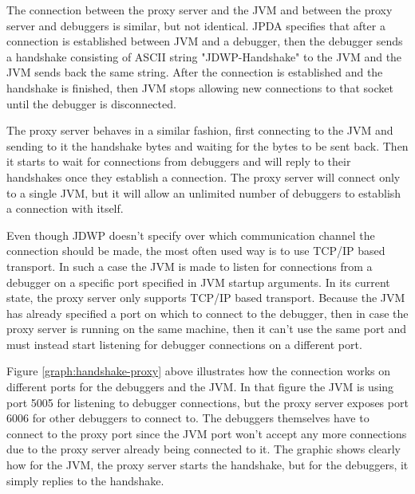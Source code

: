\documentclass[..thesis.tex]{subfiles}
\begin{document}
The connection between the proxy server and the JVM and between the proxy server and debuggers is similar, but not identical.
JPDA specifies that after a connection is established between JVM and a debugger, then the debugger sends a handshake consisting of ASCII string "JDWP-Handshake" to the JVM and the JVM sends back the same string.
After the connection is established and the handshake is finished, then JVM stops allowing new connections to that socket until the debugger is disconnected.

The proxy server behaves in a similar fashion, first connecting to the JVM and sending to it the handshake bytes and waiting for the bytes to be sent back.
Then it starts to wait for connections from debuggers and will reply to their handshakes once they establish a connection.
The proxy server will connect only to a single JVM, but it will allow an unlimited number of debuggers to establish a connection with itself.

Even though JDWP doesn't specify over which communication channel the connection should be made, the most often used way is to use TCP/IP based transport.
In such a case the JVM is made to listen for connections from a debugger on a specific port specified in JVM startup arguments.
In its current state, the proxy server only supports TCP/IP based transport.
Because the JVM has already specified a port on which to connect to the debugger, then in case the proxy server is running on the same machine, then it can't use the same port and must instead start listening for debugger connections on a different port.



Figure \ref{graph:handshake-proxy} above illustrates how the connection works on different ports for the debuggers and the JVM.
In that figure the JVM is using port 5005 for listening to debugger connections, but the proxy server exposes port 6006 for other debuggers to connect to.
The debuggers themselves have to connect to the proxy port since the JVM port won't accept any more connections due to the proxy server already being connected to it.
The graphic shows clearly how for the JVM, the proxy server starts the handshake, but for the debuggers, it simply replies to the handshake.
\end{document}

